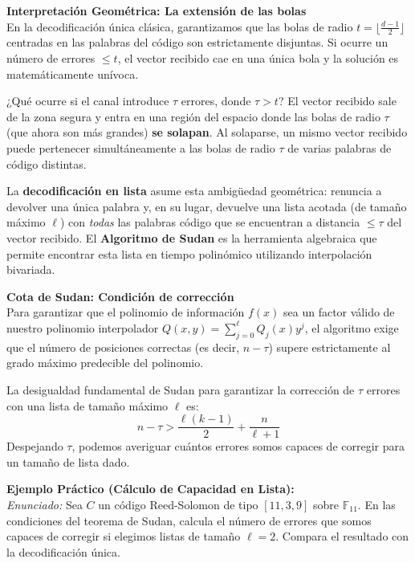 \documentclass{article}
\begin{document}
\textbf{Interpretación Geométrica: La extensión de las bolas} \\
En la decodificación única clásica, garantizamos que las bolas de radio $t = \lfloor \frac{d-1}{2} \rfloor$ centradas en las palabras del código son estrictamente disjuntas. Si ocurre un número de errores $\le t$, el vector recibido cae en una única bola y la solución es matemáticamente unívoca.

¿Qué ocurre si el canal introduce $\tau$ errores, donde $\tau > t$? El vector recibido sale de la zona segura y entra en una región del espacio donde las bolas de radio $\tau$ (que ahora son más grandes) \textbf{se solapan}. Al solaparse, un mismo vector recibido puede pertenecer simultáneamente a las bolas de radio $\tau$ de varias palabras de código distintas. 

La \textbf{decodificación en lista} asume esta ambigüedad geométrica: renuncia a devolver una única palabra y, en su lugar, devuelve una lista acotada (de tamaño máximo $\ell$) con \textit{todas} las palabras código que se encuentran a distancia $\le \tau$ del vector recibido. El \textbf{Algoritmo de Sudan} es la herramienta algebraica que permite encontrar esta lista en tiempo polinómico utilizando interpolación bivariada.

\textbf{Cota de Sudan: Condición de corrección} \\
Para garantizar que el polinomio de información $f(x)$ sea un factor válido de nuestro polinomio interpolador $Q(x,y) = \sum_{j=0}^\ell Q_j(x)y^j$, el algoritmo exige que el número de posiciones correctas (es decir, $n - \tau$) supere estrictamente al grado máximo predecible del polinomio. 

La desigualdad fundamental de Sudan para garantizar la corrección de $\tau$ errores con una lista de tamaño máximo $\ell$ es:
\[
n - \tau > \frac{\ell(k-1)}{2} + \frac{n}{\ell+1}
\]
Despejando $\tau$, podemos averiguar cuántos errores somos capaces de corregir para un tamaño de lista dado.

\vspace{0.3cm}
\textbf{Ejemplo Práctico (Cálculo de Capacidad en Lista):} \\
\textit{Enunciado:} Sea $C$ un código Reed-Solomon de tipo $[11, 3, 9]$ sobre $\mathbb{F}_{11}$. En las condiciones del teorema de Sudan, calcula el número de errores que somos capaces de corregir si elegimos listas de tamaño $\ell=2$. Compara el resultado con la decodificación única.
\end{document}

